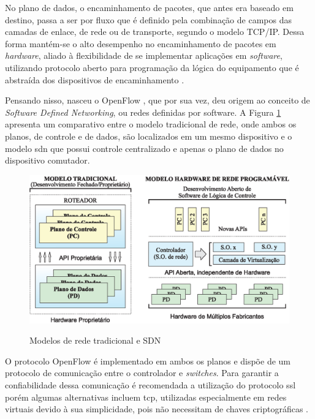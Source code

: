No plano de dados, o encaminhamento de pacotes, que antes era baseado em destino, passa a ser por fluxo que é definido pela combinação de campos das camadas de enlace, de rede ou de transporte, segundo o modelo TCP/IP. Dessa forma mantém-se o alto desempenho no encaminhamento de pacotes em \textit{hardware}, aliado à flexibilidade de se implementar aplicações em \textit{software}, utilizando protocolo aberto para programação da lógica do equipamento que é abstraída dos dispositivos de encaminhamento \cite{Kim:2013, Tootoonchian:2010, Rothenberg:2010}.

Pensando nisso, nasceu o OpenFlow \cite{McKeown:2008}, que por sua vez, deu origem ao conceito de \textit{Software Defined Networking}, ou redes definidas por software. A Figura \ref{fig:arch-old-sdn} apresenta um comparativo entre o modelo tradicional de rede, onde ambos os planos, de controle e de dados, são localizados em um mesmo dispositivo e o modelo \gls{sdn} que possui controle centralizado e apenas o plano de dados no dispositivo comutador.

\begin{figure}[H]
  \centering
  \caption{Modelos de rede tradicional e SDN}
  \includegraphics[width=.80\textwidth]{images/arch-old-sdn.eps}
  \label{fig:arch-old-sdn}
\end{figure}
\FloatBarrier

O protocolo OpenFlow é implementado em ambos os planos e dispõe de um protocolo de comunicação entre o controlador e \textit{switches}. Para garantir a confiabilidade dessa comunicação é recomendada a utilização do protocolo \gls{ssl} \cite{RFC6101} porém algumas alternativas incluem \gls{tcp}, utilizadas especialmente em redes virtuais devido à sua simplicidade, pois não necessitam de chaves criptográficas \cite{Rothenberg:2010}.

